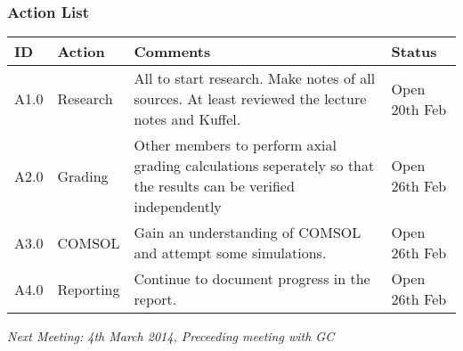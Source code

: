 \subsubsection{Action List}
\begin{center}
\begin{longtable}{| p{} | >{\raggedright\arraybackslash}p{} |  p{} | >{\raggedright\arraybackslash}p{}|} \hline
\textbf{ID} & \textbf{Action} & \textbf{Comments} & \textbf{Status} \\ \hline
\endhead
A1.0	&	Research	&	All to start research. Make notes of all sources. At least reviewed the lecture notes and Kuffel.	& Open 20th Feb \\ \hline
A2.0	&	Grading	&	Other members to perform axial grading calculations seperately so that the results can be verified independently	& Open 26th Feb \\ \hline
A3.0	&	COMSOL	&	Gain an understanding of COMSOL and attempt some simulations. & Open 26th Feb \\ \hline
A4.0	&	Reporting	&	Continue to document progress in the report.	&	Open 26th Feb \\ \hline
	
\end{longtable}
\end{center}

\emph{Next Meeting: 4th March 2014, Preceeding meeting with GC}